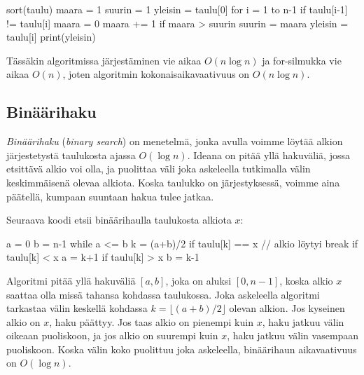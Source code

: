 \begin{code}
sort(taulu)
maara = 1
suurin = 1
yleisin = taulu[0]
for i = 1 to n-1
    if taulu[i-1] != taulu[i]
        maara = 0
    maara += 1
    if maara > suurin
        suurin = maara
        yleisin = taulu[i]
print(yleisin)
\end{code}

Tässäkin algoritmissa järjestäminen vie aikaa $O(n \log n)$ ja
for-silmukka vie aikaa $O(n)$, joten algoritmin
kokonaisaikavaativuus on $O(n \log n)$.

\subsection{Binäärihaku}


\emph{Binäärihaku} (\emph{binary search}) on menetelmä, jonka avulla voimme löytää alkion
järjestetystä taulukosta ajassa $O(\log n)$.
Ideana on pitää yllä hakuväliä, jossa etsittävä alkio voi olla,
ja puolittaa väli joka askeleella tutkimalla välin
keskimmäisenä olevaa alkiota.
Koska taulukko on järjestyksessä, voimme aina päätellä,
kumpaan suuntaan hakua tulee jatkaa.

Seuraava koodi etsii binäärihaulla taulukosta alkiota $x$:

\begin{code}
a = 0
b = n-1
while a <= b
    k = (a+b)/2
    if taulu[k] == x
        // alkio löytyi
        break
    if taulu[k] < x
        a = k+1
    if taulu[k] > x
        b = k-1
\end{code}

Algoritmi pitää yllä hakuväliä $[a,b]$, joka on aluksi $[0,n-1]$,
koska alkio $x$ saattaa olla missä tahansa kohdassa taulukossa.
Joka askeleella algoritmi tarkastaa välin keskellä kohdassa
$k=\lfloor (a+b)/2 \rfloor$ olevan alkion.
Jos kyseinen alkio on $x$, haku päättyy.
Jos taas alkio on pienempi kuin $x$, haku jatkuu välin
oikeaan puoliskoon,
ja jos alkio on suurempi kuin $x$, haku jatkuu välin
vasempaan puoliskoon.
Koska välin koko puolittuu joka askeleella,
binäärihaun aikavaativuus on $O(\log n)$.

